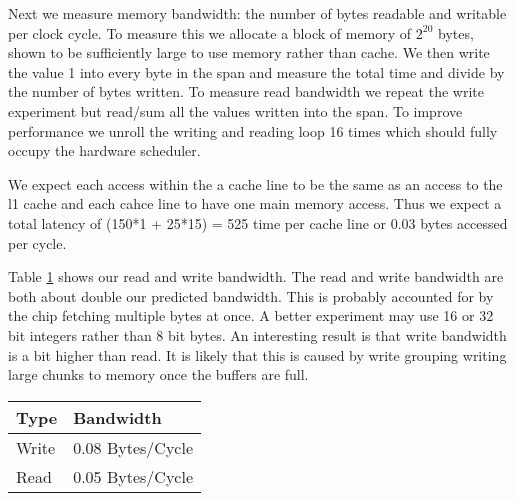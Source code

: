 Next we measure memory bandwidth: the number of bytes readable and writable per clock cycle.  
To measure this we allocate a block of memory of $2^{20}$ bytes, shown to be sufficiently large to use memory rather than cache.
We then write the value 1 into every byte in the span and measure the total time and divide by the number of bytes written.
To measure read bandwidth we repeat the write experiment but read/sum all the values written into the span.
To improve performance we unroll the writing and reading loop 16 times which should fully occupy the hardware scheduler.

We expect each access within the a cache line to be the same as an access to the l1 cache and each cahce line to have one main memory access.  Thus we expect a total latency of (150*1 + 25*15) = 525 time per cache line or 0.03 bytes accessed per cycle.  

Table \ref{tab:exp_2_2} shows our read and write bandwidth.  The read and write bandwidth are both about double our predicted bandwidth.  This is probably accounted for by the chip fetching multiple bytes at once.  A better experiment may use 16 or 32 bit integers rather than 8 bit bytes.  An interesting result is that write bandwidth is a bit higher than read.  It is likely that this is caused by write grouping writing large chunks to memory once the buffers are full. 

\begin{table}[h]
\label{tab:exp_2_2}
\begin{tabular}{|l|l|}
\hline
Type  & Bandwidth        \\\hline
Write & 0.08 Bytes/Cycle \\\hline
Read  & 0.05 Bytes/Cycle \\ \hline
\end{tabular}
\end{table}